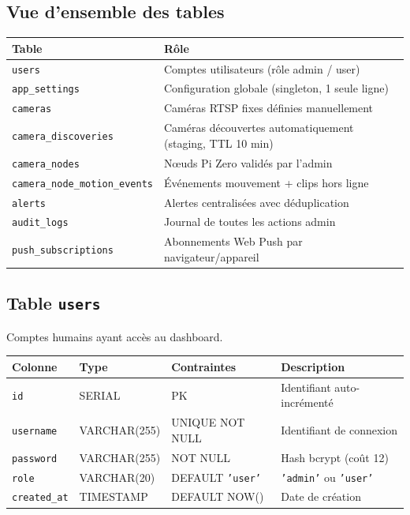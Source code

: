 \documentclass[12pt,a4paper]{article}
\begin{document}
\subsection{Vue d'ensemble des tables}

\begin{longtable}{|l|p{10cm}|}
\hline
\textbf{Table} & \textbf{Rôle} \\
\hline
\endhead
\hline
\endfoot
\texttt{users} & Comptes utilisateurs (rôle admin / user) \\
\texttt{app\_settings} & Configuration globale (singleton, 1 seule ligne) \\
\texttt{cameras} & Caméras RTSP fixes définies manuellement \\
\texttt{camera\_discoveries} & Caméras découvertes automatiquement (staging, TTL 10 min) \\
\texttt{camera\_nodes} & Nœuds Pi Zero validés par l'admin \\
\texttt{camera\_node\_motion\_events} & Événements mouvement + clips hors ligne \\
\texttt{alerts} & Alertes centralisées avec déduplication \\
\texttt{audit\_logs} & Journal de toutes les actions admin \\
\texttt{push\_subscriptions} & Abonnements Web Push par navigateur/appareil \\
\hline
\end{longtable}

\subsection{Table \texttt{users}}

Comptes humains ayant accès au dashboard.

\begin{longtable}{|l|l|l|p{5cm}|}
\hline
\textbf{Colonne} & \textbf{Type} & \textbf{Contraintes} & \textbf{Description} \\
\hline
\endhead
\hline
\endfoot
\texttt{id} & SERIAL & PK & Identifiant auto-incrémenté \\
\texttt{username} & VARCHAR(255) & UNIQUE NOT NULL & Identifiant de connexion \\
\texttt{password} & VARCHAR(255) & NOT NULL & Hash bcrypt (coût 12) \\
\texttt{role} & VARCHAR(20) & DEFAULT \texttt{'user'} & \texttt{'admin'} ou \texttt{'user'} \\
\texttt{created\_at} & TIMESTAMP & DEFAULT NOW() & Date de création \\
\hline
\end{longtable}
\end{document}
